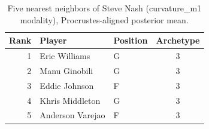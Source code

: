 \begin{table}[htbp]
  \centering\small
  \begin{tabular}{rllc}
    \toprule
    Rank & Player & Position & Archetype \\
    \midrule
    1 & Eric Williams & G & 3 \\
    2 & Manu Ginobili & G & 3 \\
    3 & Eddie Johnson & F & 3 \\
    4 & Khris Middleton & G & 3 \\
    5 & Anderson Varejao & F & 3 \\
    \bottomrule
  \end{tabular}
  \caption{Five nearest neighbors of Steve Nash (curvature_m1 modality), Procrustes-aligned posterior mean.}
  \label{tab:Steve_Nash_neighbors_curvature_m1}
\end{table}

